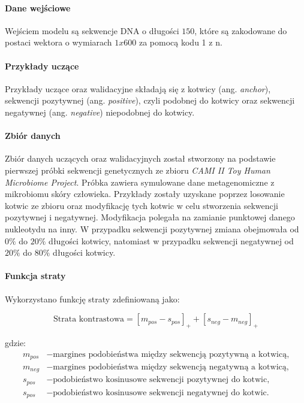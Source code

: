             \paragraph{Dane wejściowe}
                Wejściem modelu są sekwencje DNA o długości $150$, które są zakodowane do postaci wektora o wymiarach $1x600$ za pomocą kodu 1 z n\cite{HarrisDavid:2007}.
            
            \paragraph{Przykłady uczące}
                Przykłady uczące oraz walidacyjne składają się z kotwicy (ang. \textit{anchor}), sekwencji pozytywnej (ang. \textit{positive}), czyli podobnej do kotwicy oraz sekwencji negatywnej (ang. \textit{negative}) niepodobnej do kotwicy.
            
            \paragraph{Zbiór danych}
                Zbiór danych uczących oraz walidacyjnych został stworzony na podstawie pierwszej próbki sekwencji genetycznych ze zbioru \textit{CAMI II Toy Human Microbiome Project}\cite{Fritz:2019}. Próbka zawiera symulowane dane metagenomiczne z mikrobiomu skóry człowieka. Przykłady zostały uzyskane poprzez losowanie kotwic ze zbioru oraz modyfikację tych kotwic w celu stworzenia sekwencji pozytywnej i negatywnej. Modyfikacja polegała na zamianie punktowej danego nukleotydu na inny. W przypadku sekwencji pozytywnej zmiana obejmowała od $0\%$ do $20\%$ długości kotwicy, natomiast w przypadku sekwencji negatywnej od $20\%$ do $80\%$ długości kotwicy.

            \paragraph{Funkcja straty}
                Wykorzystano funkcję straty zdefiniowaną jako:

                \begin{equation}
                    \text{Strata kontrastowa} = [m_{pos} - s_{pos}]_{+} + [s_{neg} - m_{neg}]_{+}
                \end{equation}

                gdzie:
                \begin{align*}
                    m_{pos} &- \text{margines podobieństwa między sekwencją pozytywną a kotwicą,} \\
                    m_{neg} &- \text{margines podobieństwa między sekwencją negatywną a kotwicą,} \\
                    s_{pos} &- \text{podobieństwo kosinusowe sekwencji pozytywnej do kotwic,} \\
                    s_{pos} &- \text{podobieństwo kosinusowe sekwencji negatywnej do kotwic.} \\
                \end{align*}


